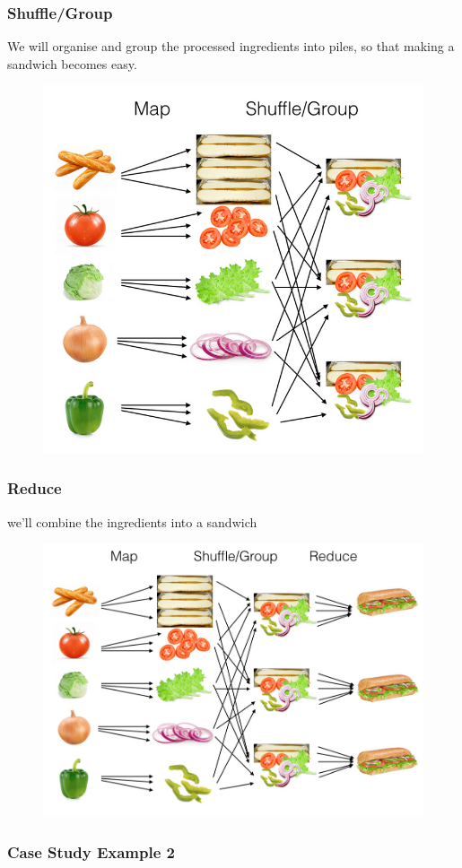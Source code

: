 \begin{frame}
	\frametitle{Shuffle/Group}
	We will organise and group the processed ingredients into piles, so that making a sandwich becomes easy.
		\begin{figure}
		\includegraphics[width=.7\textwidth,height=.64\textheight]{./Figures/chapter-02/map-reduce-shuffle.png}
	\end{figure}			
\end{frame}
\begin{frame}
	\frametitle{Reduce}
	we’ll combine the ingredients into a sandwich
	\begin{figure}
		\includegraphics[width=.96\textwidth,height=.7\textheight]{./Figures/chapter-02/map-reduce-reduce-side.png}
	\end{figure}			
\end{frame}


\begin{frame}[plain,c]
	\frametitle{Case Study Example 2}
	\begin{figure}
		\centering
		
	\end{figure}
	
\end{frame}
